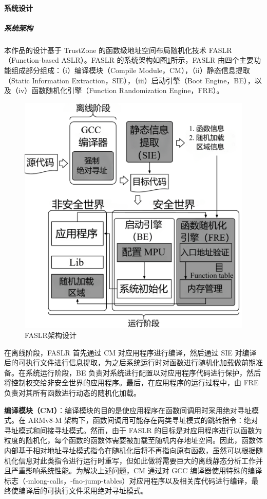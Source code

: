 \documentclass[UTF8,12pt,a4paper]{ctexart}
\numberwithin{figure}{section}
\begin{document}
\paragraph{系统设计}
\subparagraph{系统架构}
\par 本作品的设计基于 TrustZone 的函数级地址空间布局随机化技术 FASLR（Function-based ASLR）。FASLR 的系统架构如图\ref{fig:alsr_architecture}所示，FASLR 由四个主要功能组成部分组成：（i）编译模块（Compile Module，CM），（ii）静态信息提取（Static Information Extraction，SIE），（iii）启动引擎（Boot Engine，BE），以及（iv）函数随机化引擎（Function Randomization Engine，FRE）。
\begin{figure}[H]
    \centering
    \includegraphics[scale=0.3]{graph/aslr_architecture.png}
    \caption{FASLR架构设计}
    \label{fig:alsr_architecture}
\end{figure}
\par 在离线阶段，FASLR 首先通过 CM 对应用程序进行编译，然后通过 SIE 对编译后的可执行文件进行信息提取，为之后系统运行时对函数进行随机化加载做前期准备。在系统运行阶段，BE 负责对系统进行配置以对应用程序代码进行保护，然后将控制权交给非安全世界的应用程序。最后，在应用程序的运行过程中，由 FRE 负责对其所有函数进行动态的随机化加载。
\par \textbf{编译模块（CM）}：编译模块的目的是使应用程序在函数间调用时采用绝对寻址模式。在 ARMv8-M 架构下，函数间调用可能存在两类寻址模式的跳转指令：绝对寻址模式和间接寻址模式。然而，由于 FASLR 的目标是对应用程序进行以函数为粒度的随机化，每个函数的函数体需要被加载至随机内存地址空间。因此，函数体内部基于相对地址寻址模式指令在随机化后将不再指向原有函数，虽然可以根据随机化信息对此类指令进行运行时重写，但如此做将需要巨大的离线静态分析工作并且严重影响系统性能。为解决上述问题，CM 通过对 GCC 编译器使用特殊的编译标志（-mlong-calls，-fno-jump-tables）对应用程序以及相关库代码进行编译，最终使编译后的可执行文件采用绝对寻址模式。
\end{document}
